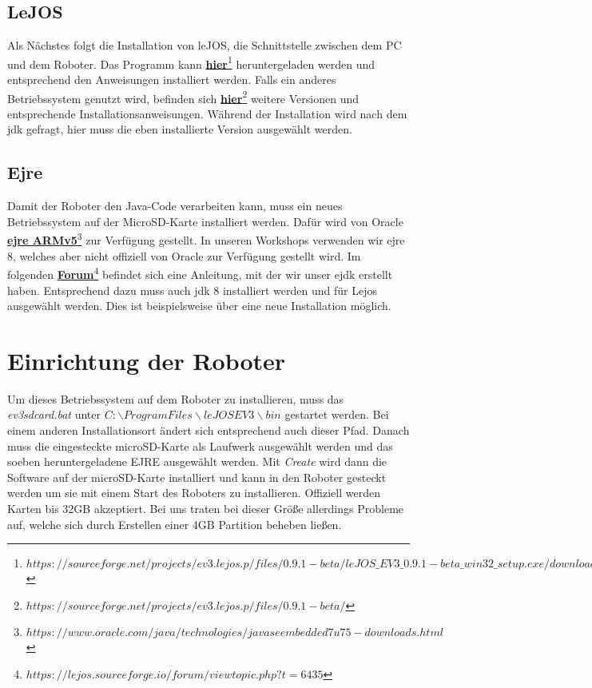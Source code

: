 \documentclass[
	ngerman,
	accentcolor=1c,%
	]{tudapub}
\begin{document}
\subsection{LeJOS}
Als N\"achstes folgt die Installation von leJOS, die Schnittstelle zwischen dem PC und dem Roboter. Das Programm kann
\href{https://sourceforge.net/projects/ev3.lejos.p/files/0.9.1-beta/leJOS\_EV3\_0.9.1-beta\_win32\_setup.exe/download}{\textbf{hier}\footnote{$https://sourceforge.net/projects/ev3.lejos.p/files/0.9.1-beta/leJOS\_EV3\_0.9.1-beta\_win32\_setup.exe/download$}}
heruntergeladen werden und entsprechend den Anweisungen installiert werden.\newline
Falls ein anderes Betriebssystem genutzt wird, befinden sich
\href{https://sourceforge.net/projects/ev3.lejos.p/files/0.9.1-beta/}{\textbf{hier}\footnote{$https://sourceforge.net/projects/ev3.lejos.p/files/0.9.1-beta/$}} weitere Versionen und entsprechende Installationsanweisungen.\newline
Während der Installation wird nach dem jdk gefragt, hier muss die eben installierte Version ausgewählt werden.

\subsection{Ejre}
Damit der Roboter den Java-Code verarbeiten kann, muss ein neues Betriebssystem auf der MicroSD-Karte installiert werden. Daf\"ur wird von Oracle
\href{https://www.oracle.com/java/technologies/javaseembedded7u75-downloads.html}{\textbf{ejre ARMv5}\footnote{$https://www.oracle.com/java/technologies/javaseembedded7u75-downloads.html$}}
zur Verfügung gestellt. In unseren Workshops verwenden wir ejre 8, welches aber nicht offiziell von Oracle zur Verfügung gestellt wird. Im folgenden
\href{https://lejos.sourceforge.io/forum/viewtopic.php?t=6435}{\textbf{Forum}\footnote{$https://lejos.sourceforge.io/forum/viewtopic.php?t=6435$}} befindet sich eine Anleitung, mit der wir unser ejdk erstellt haben. Entsprechend dazu muss auch jdk 8 installiert werden und für Lejos ausgewählt werden. Dies ist beispielsweise über eine neue Installation möglich.\newline

\section{Einrichtung der Roboter}
Um dieses Betriebssystem auf dem Roboter zu installieren, muss das \textit{ev3sdcard.bat} unter \textit{$C:\backslash Program Files\backslash leJOS EV3\backslash bin$} gestartet werden. Bei einem anderen Installationsort \"andert sich entsprechend auch dieser Pfad.\newline
Danach muss die eingesteckte microSD-Karte als Laufwerk ausgew\"ahlt werden und das soeben heruntergeladene EJRE ausgew\"ahlt werden. Mit \textit{Create} wird dann die Software auf der microSD-Karte installiert und kann in den Roboter gesteckt werden um sie mit einem Start des Roboters zu installieren.  Offiziell werden Karten bis 32GB akzeptiert. Bei uns traten bei dieser Größe allerdings Probleme auf, welche sich durch Erstellen einer 4GB Partition beheben ließen.
\end{document}
